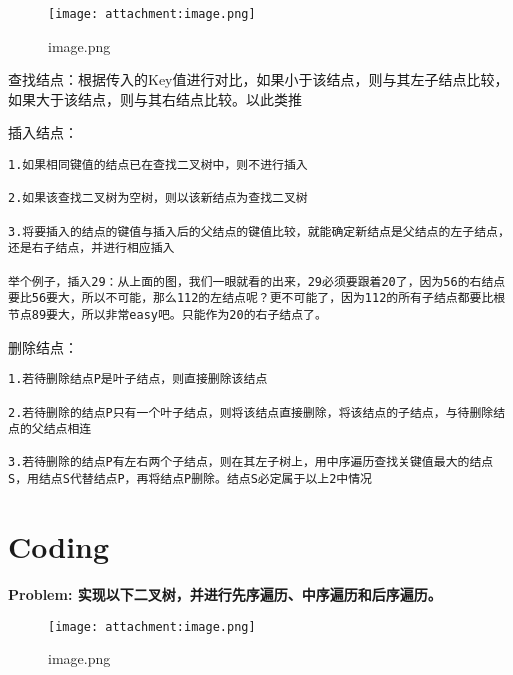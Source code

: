 \documentclass[11pt]{article}
\makeatletter
\def\maxwidth{\ifdim\Gin@nat@width>\linewidth\linewidth
    \else\Gin@nat@width\fi}
\let\Oldincludegraphics\includegraphics
\renewcommand{\includegraphics}[1]{\Oldincludegraphics[width=.8\maxwidth]{#1}}
\makeatother
\begin{document}
    \begin{figure}
\centering
\texttt{[image: attachment:image.png]}
\caption{image.png}
\end{figure}

查找结点：根据传入的Key值进行对比，如果小于该结点，则与其左子结点比较，如果大于该结点，则与其右结点比较。以此类推

插入结点：

\begin{verbatim}
1.如果相同键值的结点已在查找二叉树中，则不进行插入

2.如果该查找二叉树为空树，则以该新结点为查找二叉树

3.将要插入的结点的键值与插入后的父结点的键值比较，就能确定新结点是父结点的左子结点，还是右子结点，并进行相应插入

举个例子，插入29：从上面的图，我们一眼就看的出来，29必须要跟着20了，因为56的右结点要比56要大，所以不可能，那么112的左结点呢？更不可能了，因为112的所有子结点都要比根节点89要大，所以非常easy吧。只能作为20的右子结点了。
\end{verbatim}

删除结点：

\begin{verbatim}
1.若待删除结点P是叶子结点，则直接删除该结点

2.若待删除的结点P只有一个叶子结点，则将该结点直接删除，将该结点的子结点，与待删除结点的父结点相连

3.若待删除的结点P有左右两个子结点，则在其左子树上，用中序遍历查找关键值最大的结点S，用结点S代替结点P，再将结点P删除。结点S必定属于以上2中情况
\end{verbatim}

    \section{Coding}\label{coding}

    \textbf{Problem: 实现以下二叉树，并进行先序遍历、中序遍历和后序遍历。}

\begin{figure}
\centering
\texttt{[image: attachment:image.png]}
\caption{image.png}
\end{figure}
\end{document}
